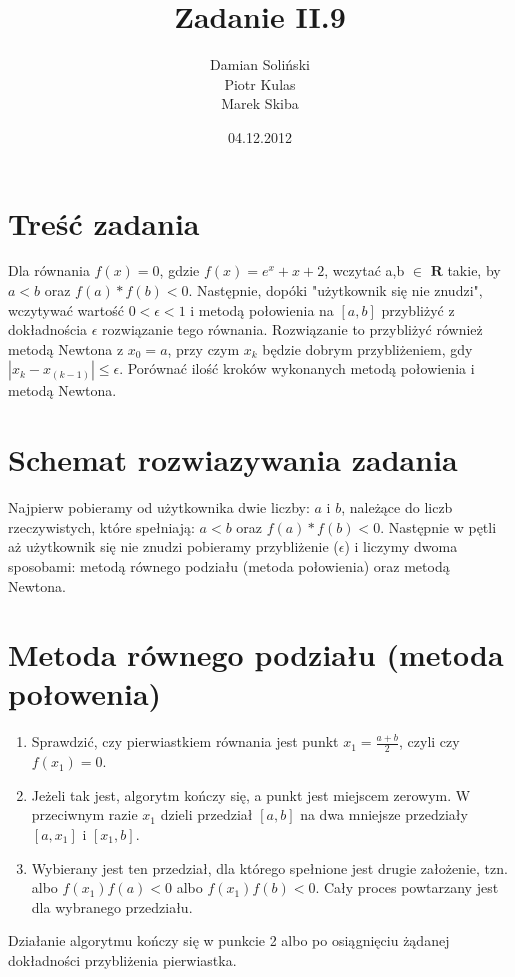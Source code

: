 \documentclass[11pt]{article}
\title{\textbf{Zadanie II.9}}
\author{Damian Soliński\\
		Piotr Kulas\\
		Marek Skiba}
\date{04.12.2012}
\begin{document}
\maketitle

\section{Treść zadania}

Dla równania $f(x) = 0$, gdzie $f(x) = e^x + x + 2$, wczytać a,b $\in$ $\mathbf{R}$ takie, by $a<b$ oraz $f(a) * f(b) < 0$. Następnie, dopóki "użytkownik się nie znudzi", wczytywać wartość $0 < \epsilon < 1$ i metodą połowienia na $[a,b]$ przybliżyć z dokładnościa $\epsilon$ rozwiązanie tego równania. Rozwiązanie to przybliżyć również metodą Newtona z $x_0 = a$, przy czym $x_k$ będzie dobrym przybliżeniem, gdy $|x_k - x_(k-1)| \leq \epsilon$. Porównać ilość kroków wykonanych metodą połowienia i metodą Newtona.

\section{Schemat rozwiazywania zadania}
Najpierw pobieramy od użytkownika dwie liczby: $a$ i $b$, należące do liczb rzeczywistych, które spełniają: $a<b$ oraz $f(a) * f(b) < 0$. Następnie w pętli aż użytkownik się nie znudzi pobieramy przybliżenie ($\epsilon$) i liczymy dwoma sposobami: metodą równego podziału (metoda połowienia) oraz metodą Newtona.

\clearpage
\section*{Metoda równego podziału (metoda połowenia)}

\begin{enumerate}
  \item Sprawdzić, czy pierwiastkiem równania jest punkt $x_{1} = \frac{a+b}{2}$, czyli czy $f(x_{1}) = 0$.
  \item Jeżeli tak jest, algorytm kończy się, a punkt jest miejscem zerowym. W przeciwnym razie $x_{1}$ dzieli przedział $[a,b]$ na dwa mniejsze przedziały $[a, x_{1}]$ i $[x_{1}, b]$.
  \item Wybierany jest ten przedział, dla którego spełnione jest drugie założenie, tzn. albo $f(x_{1})f(a) < 0$ albo $f(x_{1})f(b) < 0$. Cały proces powtarzany jest dla wybranego przedziału.
\end{enumerate}

Działanie algorytmu kończy się w punkcie 2 albo po osiągnięciu żądanej dokładności przybliżenia pierwiastka.
\end{document}
